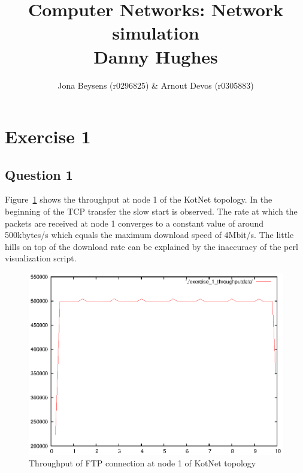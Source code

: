 \documentclass[a4paper]{report}
\title{Computer Networks: Network simulation\\ Danny Hughes}
\author{Jona Beysens (r0296825) \& Arnout Devos (r0305883)}
\begin{document}
\maketitle
\chapter*{Exercise 1}

\section*{Question 1}
Figure~\ref{ex1:question1} shows the throughput at node 1 of the KotNet topology. 
In the beginning of the TCP transfer the slow start is observed. The rate at which the packets are received at node 1 converges to a constant value of around 500kbytes/s which equals the maximum download speed of 4Mbit/s. The little hills on top of the download rate can be explained by the inaccuracy of the perl visualization script.
\begin{figure}[h]
\centerline{\includegraphics{pictures/E1Q1.eps}}
\caption{Throughput of FTP connection at node 1 of KotNet topology}
\label{ex1:question1}
\end{figure}
\end{document}
